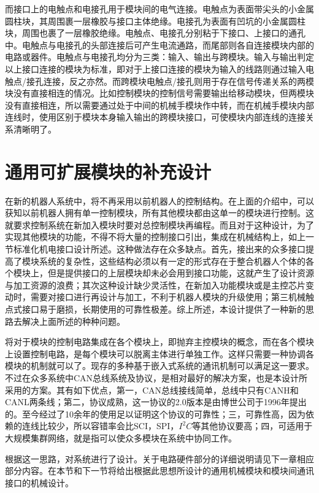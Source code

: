 而接口上的电触点和电接孔用于模块间的电气连接。电触点为表面带尖头的小金属圆柱块，其周围裹一层橡胶与接口主体绝缘。电接孔为表面有凹坑的小金属圆柱块，周围也裹了一层橡胶绝缘。电触点、电接孔分别粘于下接口、上接口的通孔中。电触点与电接孔的头部连接后可产生电流通路，而尾部则各自连接模块内部的电路或器件。电触点与电接孔均分为三类：输入、输出与跨模块。输入与输出判定以上接口连接的模块为标准，即对于上接口连接的模块为输入的线路则通过输入电触点/接孔连接，反之亦然。而跨模块电触点/接孔则用于存在信号传递关系的两模块没有直接相连的情况。比如控制模块的控制信号需要输出给移动模块，但两模块没有直接相连，所以需要通过处于中间的机械手模块作中转，而在机械手模块内部连线时，使用区别于模块本身输入输出的跨模块接口，可使模块内部连线的连接关系清晰明了。

\section{通用可扩展模块的补充设计}
在新的机器人系统中，将不再采用以前机器人的控制结构。在上面的介绍中，可以获知以前机器人拥有单一控制模块，所有其他模块都由这单一的模块进行控制。这就要求控制系统在新加入模块时要对总控制模块再编程。而且对于这种设计，为了实现其他模块的功能，不得不将大量的控制接口引出，集成在机械结构上，如上一节标准化机电接口设计所述。这种做法存在众多缺点。首先，接出来的众多接口提高了模块系统的复杂性，这些结构必须以有一定的形式存在于整合机器人个体的各个模块上，但是提供接口的上层模块却未必会用到接口功能，这就产生了设计资源与加工资源的浪费；其次这种设计缺少灵活性，在新加入功能模块或是主控芯片变动时，需要对接口进行再设计与加工，不利于机器人模块的升级使用；第三机械触点式接口易于磨损，长期使用的可靠性极差。综上所述，本设计提供了一种新的思路去解决上面所述的种种问题。

将对于模块的控制电路集成在各个模块上，即抛弃主控模块的概念，而在各个模块上设置控制电路，是每个模块可以脱离主体进行单独工作。这样只需要一种协调各模块的机制就可以了。现存的多种基于嵌入式系统的通讯机制可以满足这一要求。不过在众多系统中CAN总线系统及协议，是相对最好的解决方案，也是本设计所采用的方案。其有如下优点，第一，CAN总线接线简单，总线中只有CANH和CANL两条线；第二，协议成熟，这一协议的2.0版本是由博世公司于1996年提出的。至今经过了10余年的使用足以证明这个协议的可靠性；三，可靠性高，因为依赖的连线比较少，所以容错率会比SCI，SPI，$I^2C$等其他协议要高；四，可适用于大规模集群网络，就是指可以使众多模块在系统中协同工作。

根据这一思路，对系统进行了设计。关于电路硬件部分的详细说明请见下一章相应部分内容。在本节和下一节将给出根据此思想所设计的通用机械模块和模块间通讯接口的机械设计。

